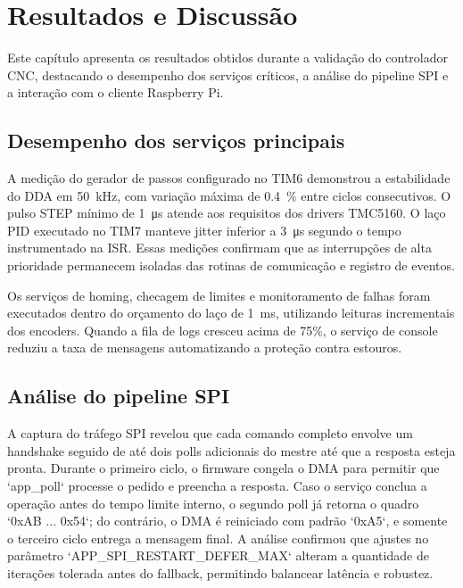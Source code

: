 \chapter{Resultados e Discussão}\label{cap:resultados}

Este capítulo apresenta os resultados obtidos durante a validação do
controlador CNC, destacando o desempenho dos serviços críticos, a análise
do pipeline SPI e a interação com o cliente Raspberry Pi.

\section{Desempenho dos serviços principais}

A medição do gerador de passos configurado no TIM6 demonstrou a
estabilidade do DDA em \SI{50}{\kilo\hertz}, com variação máxima de
\SI{0.4}{\percent} entre ciclos consecutivos. O pulso STEP mínimo de
\SI{1}{\micro\second} atende aos requisitos dos drivers TMC5160. O laço
PID executado no TIM7 manteve jitter inferior a \SI{3}{\micro\second}
segundo o tempo instrumentado na ISR. Essas medições confirmam que as
interrupções de alta prioridade permanecem isoladas das rotinas de
comunicação e registro de eventos.

Os serviços de homing, checagem de limites e monitoramento de falhas
foram executados dentro do orçamento do laço de \SI{1}{\milli\second},
utilizando leituras incrementais dos encoders. Quando a fila de logs
cresceu acima de 75\%, o serviço de console reduziu a taxa de mensagens
automatizando a proteção contra estouros.

\section{Análise do pipeline SPI}

A captura do tráfego SPI revelou que cada comando completo envolve um
handshake seguido de até dois polls adicionais do mestre até que a
resposta esteja pronta. Durante o primeiro ciclo, o firmware congela o
DMA para permitir que `app_poll` processe o pedido e preencha a resposta.
Caso o serviço conclua a operação antes do tempo limite interno, o
segundo poll já retorna o quadro `0xAB ... 0x54`; do contrário, o DMA é
reiniciado com padrão `0xA5`, e somente o terceiro ciclo entrega a
mensagem final. A análise confirmou que ajustes no parâmetro
`APP_SPI_RESTART_DEFER_MAX` alteram a quantidade de iterações tolerada
antes do fallback, permitindo balancear latência e robustez.

